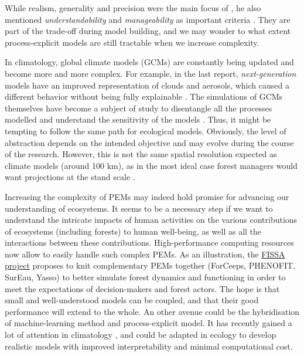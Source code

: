 While realism, generality and precision were the main focus of \citet{Levins1966}, he also mentioned \emph{understandability} and \emph{manageability} as important criteria \citep{Levins1993}. They are part of the trade-off during model building, and we may wonder to what extent process-explicit models are still tractable when we increase complexity. 

In climatology, global climate models (GCMs) are constantly being updated and become more and more complex. For example, in the last \citet{IPCC2021} report, \emph{next-generation} models have an improved representation of clouds and aerosols, which caused a different behavior without being fully explainable \citep{Voosen2019}. The simulations of GCMs themselves have become a subject of study to disentangle all the processes modelled and understand the sensitivity of the models \citep[e.g.][]{Zelinka2020}. Thus, it might be tempting to follow the same path for ecological models. Obviously, the level of abstraction depends on the intended objective and may evolve during the course of the research. However, this is not the same spatial resolution expected as climate models (around 100 km), as in the most ideal case forest managers would want projections at the stand scale \citep{Cheaib2012}.

Increasing the complexity of PEMs may indeed hold promise for advancing our understanding of ecosystems. It seems to be a necessary step if we want to understand the intricate impacts of human activities on the various contributions of ecosystems (including forests) to human well-being, as well as all the interactions between these contributions. High-performance computing resources now allow to easily handle such complex PEMs. As an illustration, the \href{https://anr.fr/Project-ANR-21-CE32-0010}{FISSA project} proposes to knit complementary PEMs together (ForCeeps, PHENOFIT, SurEau, Yasso) to better simulate forest dynamics and functioning in order to meet the expectations of decision-makers and forest actors. The hope is that small and well-understood models can be coupled, and that their good performance will extend to the whole. An other avenue could be the hybridisation of machine-learning method and process-explicit model. It has recently gained a lot of attention in climatology \citep[e.g.][]{IglesiasSuarez2024}, and could be adapted in ecology to develop realistic models with improved interpretability and minimal computational cost.

